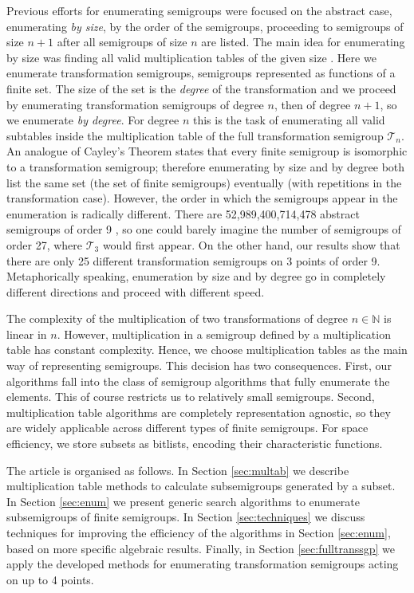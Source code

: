 \documentclass{amsart}
\newcommand{\cT}{{\mathcal T}}
\theoremstyle{plain}
\theoremstyle{definition}
\begin{document}
Previous efforts for enumerating semigroups were focused on the abstract case, enumerating \emph{by size}, by the order of the semigroups, proceeding to semigroups of size $n+1$ after all semigroups of size $n$ are listed.
The main idea for enumerating by size was finding all valid multiplication tables of the given size \cite{monoidenum2009,For55,JW77,KRS76,Ple67,SZT94,tamura2,tamura1}.
Here we enumerate transformation semigroups, semigroups represented as functions of a finite set.
The size of the set is the \emph{degree} of the transformation and we proceed by enumerating transformation semigroups of degree $n$, then of degree $n+1$, so we enumerate \emph{by degree}.
For degree $n$ this is the task of enumerating all valid subtables inside the
multiplication table of the full transformation semigroup $\cT_n$. 
An analogue of Cayley's Theorem states that every finite semigroup is isomorphic to
a transformation semigroup; therefore enumerating by size and by degree both
list the same set (the set of finite semigroups) eventually (with repetitions in the transformation
case).
 However,
the order in which the semigroups appear in the enumeration is radically
different.  There are 52,989,400,714,478 abstract semigroups of order 9
\cite{monoidenum2009}, so one could barely imagine the number of semigroups of
order 27, where $\cT_3$ would first appear.  On the other hand, our results show that there are only
25 different transformation semigroups on 3 points of order 9.
Metaphorically speaking, enumeration by size and by degree go in completely different
directions and proceed with different speed.

The complexity of the multiplication of two transformations of degree $n\in\mathbb{N}$ is linear in $n$.
However, multiplication in a semigroup defined by a multiplication table has constant complexity.
Hence, we choose multiplication tables as the main way of representing semigroups.
This decision has two consequences. 
First, our algorithms fall into the class of semigroup algorithms that fully enumerate the elements.
This of course  restricts us to relatively small semigroups. %
Second, multiplication table algorithms are completely representation agnostic,
so they are widely applicable across different types of finite semigroups.
For space efficiency, we store subsets as bitlists, encoding their characteristic functions.

The article is organised as follows.
In Section \ref{sec:multab} we describe multiplication table methods to calculate subsemigroups generated by a subset.
In Section \ref{sec:enum} we present generic search algorithms to enumerate subsemigroups of
finite semigroups.
In Section \ref{sec:techniques} we discuss techniques for improving the
efficiency of the algorithms in Section \ref{sec:enum}, based on more specific algebraic results.
Finally, in Section \ref{sec:fulltranssgp} we apply the developed methods for enumerating transformation semigroups acting on up to 4 points.
\end{document}

